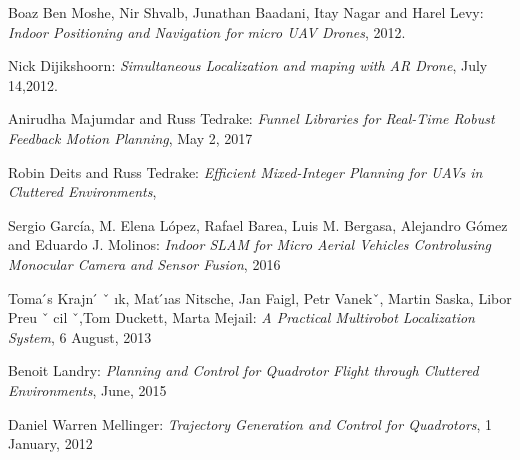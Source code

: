 \documentclass[a4paper,12pt,oneside]{book}
\begin{document}
\begin{thebibliography}{li}
Boaz Ben Moshe, Nir Shvalb, Junathan Baadani, Itay Nagar and Harel Levy:
{\em Indoor Positioning and Navigation for micro UAV Drones},
2012.

Nick Dijikshoorn:
{\em Simultaneous Localization and maping with AR Drone},
July 14,2012.

Anirudha Majumdar and Russ Tedrake:
{\em Funnel Libraries for Real-Time Robust Feedback Motion Planning},
May 2, 2017

Robin Deits and Russ Tedrake:
{\em Efficient Mixed-Integer Planning for UAVs in Cluttered Environments},

Sergio García, M. Elena López, Rafael Barea, Luis M. Bergasa, Alejandro Gómez and Eduardo J. Molinos:
{\em Indoor SLAM for Micro Aerial Vehicles Controlusing Monocular Camera and Sensor Fusion},
2016

Toma ́s Krajn ́ ˇ ık, Mat ́ıas Nitsche, Jan Faigl,
Petr Vanekˇ, Martin Saska, Libor Preu ˇ cil ˇ,Tom Duckett, Marta Mejail:
{\em A Practical Multirobot Localization System},
6 August, 2013

Benoit Landry:
{\em Planning and Control for Quadrotor Flight through Cluttered Environments},
June, 2015

Daniel Warren Mellinger:
{\em Trajectory Generation and Control for Quadrotors},
1 January, 2012

\end{thebibliography}
\end{document}

